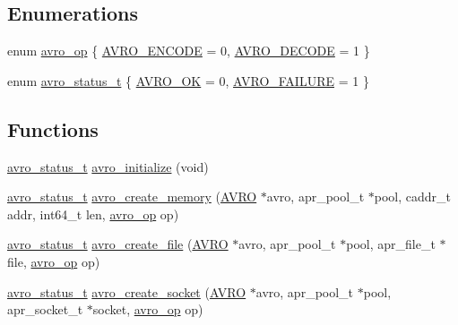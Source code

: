 \subsection*{Enumerations}
\begin{CompactItemize}
\item 
enum \hyperlink{group___handle___routines_gcd8ee9ad4a4882eef8e3d9a0d5faec68}{avro\_\-op} \{ \hyperlink{group___handle___routines_ggcd8ee9ad4a4882eef8e3d9a0d5faec68037c26ec9dd8b98243aa9aed3f80160b}{AVRO\_\-ENCODE} =  0, 
\hyperlink{group___handle___routines_ggcd8ee9ad4a4882eef8e3d9a0d5faec682802292d4fd32b8eb68872bcc03bd1dd}{AVRO\_\-DECODE} =  1
 \}
\item 
enum \hyperlink{group___handle___routines_g4271ca78aabaaad628d7b632aa5a1499}{avro\_\-status\_\-t} \{ \hyperlink{group___handle___routines_gg4271ca78aabaaad628d7b632aa5a1499c6fd26496969f7d61ece32e42612675f}{AVRO\_\-OK} =  0, 
\hyperlink{group___handle___routines_gg4271ca78aabaaad628d7b632aa5a1499c0a18cacdcccfd794fc1c49b3e98c5bb}{AVRO\_\-FAILURE} =  1
 \}
\end{CompactItemize}
\subsection*{Functions}
\begin{CompactItemize}
\item 
\hyperlink{group___handle___routines_g4271ca78aabaaad628d7b632aa5a1499}{avro\_\-status\_\-t} \hyperlink{group___handle___routines_gabfc5b0acfbb6439e7d3d7511035f11b}{avro\_\-initialize} (void)
\item 
\hyperlink{group___handle___routines_g4271ca78aabaaad628d7b632aa5a1499}{avro\_\-status\_\-t} \hyperlink{group___handle___routines_ga8d57587e61e593b8878b80163977430}{avro\_\-create\_\-memory} (\hyperlink{struct_a_v_r_o}{AVRO} $\ast$avro, apr\_\-pool\_\-t $\ast$pool, caddr\_\-t addr, int64\_\-t len, \hyperlink{group___handle___routines_gcd8ee9ad4a4882eef8e3d9a0d5faec68}{avro\_\-op} op)
\item 
\hyperlink{group___handle___routines_g4271ca78aabaaad628d7b632aa5a1499}{avro\_\-status\_\-t} \hyperlink{group___handle___routines_g072028012d958aec05067e1c1e04ee0e}{avro\_\-create\_\-file} (\hyperlink{struct_a_v_r_o}{AVRO} $\ast$avro, apr\_\-pool\_\-t $\ast$pool, apr\_\-file\_\-t $\ast$file, \hyperlink{group___handle___routines_gcd8ee9ad4a4882eef8e3d9a0d5faec68}{avro\_\-op} op)
\item 
\hyperlink{group___handle___routines_g4271ca78aabaaad628d7b632aa5a1499}{avro\_\-status\_\-t} \hyperlink{group___handle___routines_g2fb229d05fdcaad3da0f6a9899bd09be}{avro\_\-create\_\-socket} (\hyperlink{struct_a_v_r_o}{AVRO} $\ast$avro, apr\_\-pool\_\-t $\ast$pool, apr\_\-socket\_\-t $\ast$socket, \hyperlink{group___handle___routines_gcd8ee9ad4a4882eef8e3d9a0d5faec68}{avro\_\-op} op)
\end{CompactItemize}


